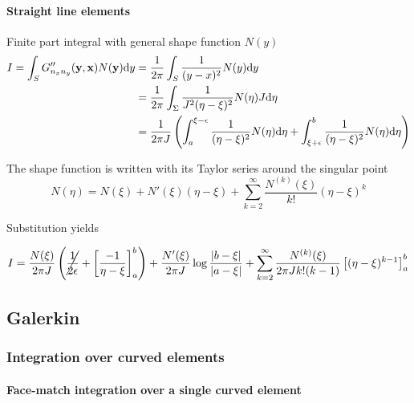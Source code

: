 \paragraph{Straight line elements}

Finite part integral with general shape function $N(y)$
%
\begin{align}
	I = \int_S G''_{n_x n_y}({\bf y}, {\bf x}) N({\bf y}) \mathrm{d} y
	&= \frac{1}{2\pi} \int_S \frac{1}{(y-x)^2} N(y) \mathrm{d} y \\
	&= \frac{1}{2\pi} \int_\Sigma \frac{1}{J^2 (\eta-\xi)^2} N(\eta) J \mathrm{d} \eta \\
	&= \frac{1}{2\pi J} \left(
		\int_a^{\xi-\epsilon} \frac{1}{(\eta-\xi)^2} N(\eta) \mathrm{d} \eta
		+ \int_{\xi+\epsilon}^{b} \frac{1}{(\eta-\xi)^2} N(\eta) \mathrm{d} \eta
	\right)
\end{align}

The shape function is written with its Taylor series around the singular point
%
\begin{equation}
	N(\eta) = N(\xi) + N'(\xi) (\eta-\xi) + \sum_{k=2}^{\infty} \frac{N^{(k)}(\xi)}{k!}(\eta-\xi)^k
\end{equation}

Substitution yields

\begin{equation}
	I = \frac{N(\xi)}{2\pi J} \left(
		\cancel{\frac{1}{2\epsilon}} + \left[ \frac{-1}{\eta-\xi} \right]_{a}^{b} 
	\right)
	+
	\frac{N'(\xi)}{2\pi J} \log \frac{|b-\xi|}{|a-\xi|}
	+ \sum_{k=2}^{\infty} \frac{N^{(k)}(\xi)}{2\pi J k! (k-1)}
		\left[ (\eta-\xi)^{k-1} \right]_{a}^{b} 
\end{equation}




\subsection{Galerkin}

\subsubsection{Integration over curved elements}

\paragraph{Face-match integration over a single curved element}

